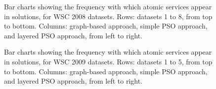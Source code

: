 \documentclass{llncs}
\begin{document}
\begin{figure}[h]
\centerline{
}
 \caption{Bar charts showing the frequency with which atomic services appear in solutions, for WSC 2008 datasets. Rows: datasets 1 to 8, from top to bottom. Columns: graph-based approach, simple PSO approach, and layered PSO approach, from left to right.}
 \label{bar_charts2008}
\end{figure}

\begin{figure}[h]
\centerline{
}
 \caption{Bar charts showing the frequency with which atomic services appear in solutions, for WSC 2009 datasets. Rows: datasets 1 to 5, from top to bottom. Columns: graph-based approach, simple PSO approach, and layered PSO approach, from left to right.}
 \label{bar_charts2009}
\end{figure}
\end{document}
